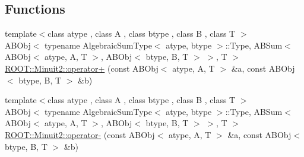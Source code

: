 \subsection*{Functions}
\begin{DoxyCompactItemize}
\item 
{\footnotesize template$<$class atype , class A , class btype , class B , class T $>$ }\\A\+B\+Obj$<$ typename Algebraic\+Sum\+Type$<$ atype, btype $>$\+::Type, A\+B\+Sum$<$ A\+B\+Obj$<$ atype, A, T $>$, A\+B\+Obj$<$ btype, B, T $>$ $>$, T $>$ \mbox{\hyperlink{namespaceROOT_1_1Minuit2_a0af705023d7183d8394e7b74563c9188}{R\+O\+O\+T\+::\+Minuit2\+::operator+}} (const A\+B\+Obj$<$ atype, A, T $>$ \&a, const A\+B\+Obj$<$ btype, B, T $>$ \&b)
\item 
{\footnotesize template$<$class atype , class A , class btype , class B , class T $>$ }\\A\+B\+Obj$<$ typename Algebraic\+Sum\+Type$<$ atype, btype $>$\+::Type, A\+B\+Sum$<$ A\+B\+Obj$<$ atype, A, T $>$, A\+B\+Obj$<$ btype, B, T $>$ $>$, T $>$ \mbox{\hyperlink{namespaceROOT_1_1Minuit2_ad72d0b214406e2325a87fe10b052b9ad}{R\+O\+O\+T\+::\+Minuit2\+::operator-\/}} (const A\+B\+Obj$<$ atype, A, T $>$ \&a, const A\+B\+Obj$<$ btype, B, T $>$ \&b)
\end{DoxyCompactItemize}
